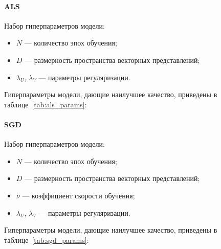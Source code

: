 \paragraph{ALS}
Набор гиперпараметров модели:
\begin{itemize}
    \item $N$ --- количество эпох обучения;
    \item $D$ --- размерность пространства векторных представлений;
    \item $\lambda_{U}$, $\lambda_{V}$ --- параметры регуляризации.
\end{itemize}

Гиперпараметры модели, дающие наилучшее качество, приведены в таблице~\ref{tab:als_params}:
\begin{table}[h]
    \caption{Гиперпараметры ALS}
    \label{tab:als_params}
\end{table}

\pagebreak
\paragraph{SGD}
Набор гиперпараметров модели:
\begin{itemize}
    \item $N$ --- количество эпох обучения;
    \item $D$ --- размерность пространства векторных представлений;
    \item $\nu$ --- коэффициент скорости обучения;
    \item $\lambda_{U}$, $\lambda_{V}$ --- параметры регуляризации.
\end{itemize}

Гиперпараметры модели, дающие наилучшее качество, приведены в таблице~\ref{tab:sgd_params}:
\begin{table}[h]
    \caption{Гиперпараметры SGD}
    \label{tab:sgd_params}
\end{table}


